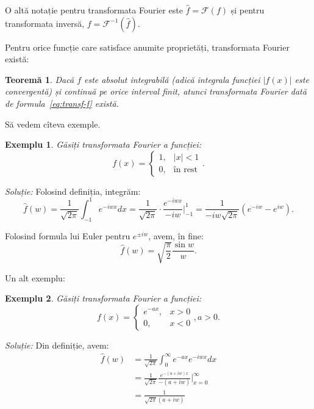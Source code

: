 \documentclass[12pt,a4paper]{article}
\newcommand\kal{\mathcal}
\theoremstyle{dotless}
\newtheorem{theorem}{Teorem\u{a}}
\theoremstyle{dotlessdr}
\newtheorem{example}{Exemplu}
\begin{document}
O altă notație pentru transformata Fourier este $ \widehat{f} = \kal{F}(f) $ și
pentru transformata inversă, $ f = \kal{F}^{-1}(\widehat{f}) $.

Pentru orice funcție care satisface anumite proprietăți, transformata Fourier există:

\begin{theorem}\label{thm:ex-four}
  Dacă $ f $ este absolut integrabilă (adică integrala funcției $ |f(x)| $ este convergentă)
  și continuă pe orice interval finit, atunci transformata Fourier dată de
  formula~\eqref{eq:transf-f} există.
\end{theorem}

Să vedem cîteva exemple.

\begin{example}
  Găsiți transformata Fourier a funcției:
  \[
    f(x) =
    \begin{cases}
      1, & |x| < 1 \\
      0, & \text{în rest}
    \end{cases}.
  \]
\end{example}

\emph{Soluție:} Folosind definiția, integrăm:
\[
  \widehat{f}(w) = \frac{1}{\sqrt{2\pi}} \int_{-1}^1 e^{-iwx} dx = %
  \frac{1}{\sqrt{2\pi}} \cdot \frac{e^{-iwx}}{-iw} \Big|_{-1}^1 = %
  \frac{1}{-iw\sqrt{2\pi}}(e^{-iw} - e^{iw}).
\]

Folosind formula lui Euler pentru $ e^{\pm iw} $, avem, în fine:
\[
  \widehat{f}(w) = \sqrt{\frac{\pi}{2}} \frac{\sin w}{w}.
\]

Un alt exemplu:

\begin{example}
  Găsiți transformata Fourier a funcției:
  \[
    f(x) =
    \begin{cases}
      e^{-ax}, & x > 0 \\
      0, & x < 0
    \end{cases}, a > 0.
  \]
\end{example}

\emph{Soluție:} Din definiție, avem:
\begin{align*}
  \widehat{f}(w) &= \frac{1}{\sqrt{2\pi}} \int_0^\infty e^{-ax} e^{-iwx} dx \\
                 &= \frac{1}{\sqrt{2\pi}} \frac{e^{-(a + iw)x}}{-(a + iw)} \Big|_{x = 0}^\infty \\
                 &= \frac{1}{\sqrt{2\pi}(a + iw)}
\end{align*}

\end{document}
